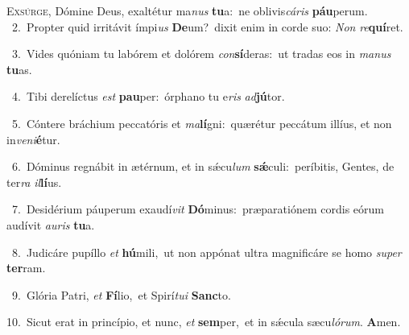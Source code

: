 \lettrine{\initial\textcolor{\initialcolor}{E}}{xsúrge,} Dómine Deus, exaltétur ma\textit{nus} \textbf{tu}\-a:~\star ne oblivis\-\textit{cá}\-\textit{ris} \textbf{páu}\-perum.\\
{\numbfont\textcolor{\numbcolor}{~2.}}~Propter quid irritávit ímpi\textit{us} \textbf{De}\-um?~\star dixit enim in corde suo: \textit{Non} \textit{re}\-\textbf{quí}ret.\par
{\numbfont\textcolor{\numbcolor}{~3.}}~Vides quóniam tu labórem et dolórem \textit{con}\-\textbf{sí}deras:~\star ut tradas eos in \textit{ma}\-\textit{nus} \textbf{tu}\-as.\par
{\numbfont\textcolor{\numbcolor}{~4.}}~Tibi derelíctus \textit{est} \textbf{pau}\-per:~\star órphano tu e\textit{ris} \textit{ad}\-\textbf{jú}tor.\par
{\numbfont\textcolor{\numbcolor}{~5.}}~Cóntere bráchium peccatóris et \textit{ma}\-\textbf{lí}gni:~\star quærétur peccátum illíus, et non in\-\textit{ve}\-\textit{ni}\textbf{é}tur.\par
{\numbfont\textcolor{\numbcolor}{~6.}}~Dóminus regnábit in ætérnum, et in sǽcu\textit{lum} \textbf{sǽ}\-culi:~\star períbitis, Gentes, de ter\textit{ra} \textit{il}\-\textbf{lí}us.\par
{\numbfont\textcolor{\numbcolor}{~7.}}~Desidérium páuperum exaudí\textit{vit} \textbf{Dó}\-minus:~\star præparatiónem cordis eórum audívit \textit{au}\-\textit{ris} \textbf{tu}\-a.\par
{\numbfont\textcolor{\numbcolor}{~8.}}~Judicáre pupíllo \textit{et} \textbf{hú}\-mili,~\star ut non appónat ultra magnificáre se homo \textit{su}\-\textit{per} \textbf{ter}\-ram.\par
{\numbfont\textcolor{\numbcolor}{~9.}}~Glória Patri, \textit{et} \textbf{Fí}\-lio,~\star et Spirí\-\textit{tu}\-\textit{i} \textbf{Sanc}\-to.\par
{\numbfont\textcolor{\numbcolor}{10.}}~Sicut erat in princípio, et nunc, \textit{et} \textbf{sem}\-per,~\star et in sǽcula sæcu\-\textit{ló}\-\textit{rum}. \textbf{A}\-men.\par
